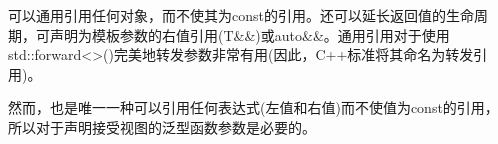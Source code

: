 


可以通用引用任何对象，而不使其为const的引用。还可以延长返回值的生命周期，可声明为模板参数的右值引用(T\&\&)或auto\&\&。通用引用对于使用std::forward<>()完美地转发参数非常有用(因此，C++标准将其命名为转发引用)。

然而，也是唯一一种可以引用任何表达式(左值和右值)而不使值为const的引用，所以对于声明接受视图的泛型函数参数是必要的。

